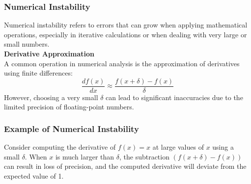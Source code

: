 \documentclass[12pt]{article}
\begin{document}
\subsubsection{Numerical Instability}
Numerical instability refers to errors that can grow when applying mathematical operations, especially in iterative calculations or when dealing with very large or small numbers.\\

\textbf{Derivative Approximation}\\
A common operation in numerical analysis is the approximation of derivatives using finite differences:
\[ \frac{df(x)}{dx} \approx \frac{f(x + \delta) - f(x)}{\delta} \]
However, choosing a very small \( \delta \) can lead to significant inaccuracies due to the limited precision of floating-point numbers.

\subsubsection{Example of Numerical Instability}
Consider computing the derivative of \( f(x) = x \) at large values of \( x \) using a small \( \delta \). When \( x \) is much larger than \( \delta \), the subtraction \( (f(x + \delta) - f(x)) \) can result in loss of precision, and the computed derivative will deviate from the expected value of 1.
\end{document}
